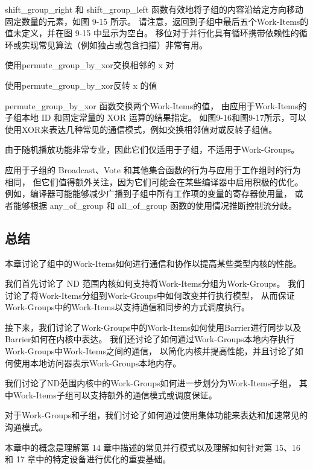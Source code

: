 shift\_group\_right 和 shift\_group\_left 函数有效地将子组的内容沿给定方向移动固定数量的元素，如图 9-15 所示。 
请注意，返回到子组中最后五个Work-Items的值未定义，并在图 9-15 中显示为空白。 
移位对于并行化具有循环携带依赖性的循环或实现常见算法（例如独占或包含扫描）非常有用。

{\color{red} 使用permute\_group\_by\_xor交换相邻的 x 对}

{\color{red} 使用permute\_group\_by\_xor反转 x 的值}

permute\_group\_by\_xor 函数交换两个Work-Items的值，
由应用于Work-Items的子组本地 ID 和固定常量的 XOR 运算的结果指定。 
如图9-16和图9-17所示，可以使用XOR来表达几种常见的通信模式，例如交换相邻值对或反转子组值。

由于随机播放功能非常专业，因此它们仅适用于子组，不适用于Work-Groups。

\begin{remark}
应用于子组的 Broadcast、Vote 和其他集合函数的行为与应用于工作组时的行为相同，
但它们值得额外关注，因为它们可能会在某些编译器中启用积极的优化。
例如，编译器可能能够减少广播到子组中所有工作项的变量的寄存器使用量，
或者能够根据 any\_of\_group 和 all\_of\_group 函数的使用情况推断控制流分歧。
\end{remark}

\subsection{总结}
本章讨论了组中的Work-Items如何进行通信和协作以提高某些类型内核的性能。

我们首先讨论了 ND 范围内核如何支持将Work-Items分组为Work-Groups。 
我们讨论了将Work-Items分组到Work-Groups中如何改变并行执行模型，
从而保证Work-Groups中的Work-Items以支持通信和同步的方式调度执行。

接下来，我们讨论了Work-Groups中的Work-Items如何使用Barrier进行同步以及Barrier如何在内核中表达。 
我们还讨论了如何通过Work-Groups本地内存执行Work-Groups中Work-Items之间的通信，
以简化内核并提高性能，并且讨论了如何使用本地访问器表示Work-Groups本地内存。

我们讨论了ND范围内核中的Work-Groups如何进一步划分为Work-Items子组，
其中Work-Items子组可以支持额外的通信模式或调度保证。

对于Work-Groups和子组，我们讨论了如何通过使用集体功能来表达和加速常见的沟通模式。

本章中的概念是理解第 14 章中描述的常见并行模式以及理解如何针对第 15、16 和 17 章中的特定设备进行优化的重要基础。